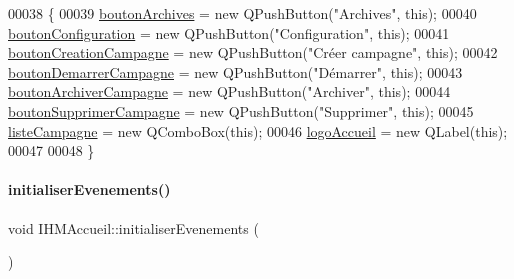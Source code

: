 \begin{DoxyCode}
00038 \{
00039     \hyperlink{class_i_h_m_accueil_a313a8c52763aa2978010db77ec6673ac}{boutonArchives} = \textcolor{keyword}{new} QPushButton(\textcolor{stringliteral}{"Archives"}, \textcolor{keyword}{this});
00040     \hyperlink{class_i_h_m_accueil_a8b8ed7d11ab66e3c6895b3c6129dc9c8}{boutonConfiguration} = \textcolor{keyword}{new} QPushButton(\textcolor{stringliteral}{"Configuration"}, \textcolor{keyword}{this});
00041     \hyperlink{class_i_h_m_accueil_a4186b4ef6a9c63f5b3c6431626ff3268}{boutonCreationCampagne} = \textcolor{keyword}{new} QPushButton(\textcolor{stringliteral}{"Créer campagne"}, \textcolor{keyword}{this});
00042     \hyperlink{class_i_h_m_accueil_a9fd8ab3abc0c1e6addd70c8d7c46fb65}{boutonDemarrerCampagne} = \textcolor{keyword}{new} QPushButton(\textcolor{stringliteral}{"Démarrer"}, \textcolor{keyword}{this});
00043     \hyperlink{class_i_h_m_accueil_a96d64cf254c0645eb45c317858b0a0f3}{boutonArchiverCampagne} = \textcolor{keyword}{new} QPushButton(\textcolor{stringliteral}{"Archiver"}, \textcolor{keyword}{this});
00044     \hyperlink{class_i_h_m_accueil_afb409fb4395372f35f9f8699fcb4c89b}{boutonSupprimerCampagne} = \textcolor{keyword}{new} QPushButton(\textcolor{stringliteral}{"Supprimer"}, \textcolor{keyword}{this});
00045     \hyperlink{class_i_h_m_accueil_afb828a4e06c25afa40341c310cd85b08}{listeCampagne} = \textcolor{keyword}{new} QComboBox(\textcolor{keyword}{this});
00046     \hyperlink{class_i_h_m_accueil_a709440124f3307589eee68c517833e6d}{logoAccueil} = \textcolor{keyword}{new} QLabel(\textcolor{keyword}{this});
00047 
00048 \}
\end{DoxyCode}
\mbox{\label{class_i_h_m_accueil_a5a571ab8f264c275580501753bb00674}} 
\paragraph{\texorpdfstring{initialiser\+Evenements()}{initialiserEvenements()}}
{\footnotesize\ttfamily void I\+H\+M\+Accueil\+::initialiser\+Evenements (\begin{DoxyParamCaption}{ }\end{DoxyParamCaption})\hspace{0.3cm}{\ttfamily [private]}}




